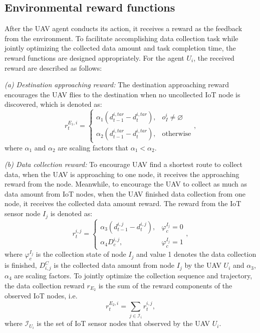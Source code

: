 \documentclass[conference]{IEEEtran}
\begin{document}
\subsection{Environmental reward functions}
After the UAV agent conducts its action, it receives a reward as the feedback from the environment. 
To facilitate accomplishing data collection task while jointly optimizing the collected data amount and task completion time, the reward functions are designed appropriately. For the agent $U_i$, the received reward are described as follows: 
 
\textit{(a) Destination approaching reward:} The destination approaching reward encourages the UAV flies to the destination when no uncollected IoT node is discovered, which is denoted as: 
\begin{equation}\label{reward_1}
r^{E_1,i}_{t}=
\begin{cases}
            \alpha_{1}\left({d_{t-1}^{i,tar}-d_{t}^{i,tar}}\right), & \mbox{$o^{i}_{I}\neq\varnothing$}\\
            \alpha_{2}\left({d_{t-1}^{i,tar}-d_{t}^{i,tar}}\right), & \mbox{otherwise}
\end{cases},
\end{equation}
where $\alpha_{1}$ and $\alpha_{2}$ are scaling factors that $\alpha_{1} < \alpha_{2}$. 

\textit{(b) Data collection reward:} To encourage UAV find a shortest route to collect data, when the UAV is approaching to one node, it receives the approaching reward from the node. Meanwhile, to encourage the UAV to collect as much as data amount from IoT nodes, when the UAV finished data collection from one node, it receives the collected data amount reward. The reward from the IoT sensor node $I_j$ is denoted as: 
\begin{equation}\label{reward_2_i}
r^{i,j}_{t}=
\begin{cases}
            \alpha_{3}\left({d_{t-1}^{i,j}-d_{t}^{i,j}}\right), & \mbox{$\varphi^{I_j}_c=0$}\\
            \alpha_{4}D_{c}^{i,j}, & \mbox{$\varphi^{I_j}_c=1$}
\end{cases},
\end{equation}
where $\varphi^{I_j}_c$ is the collection state of node $I_j$ and value 1 denotes the data collection is finished, $D^{C}_{i,j}$ is the collected data amount from node $I_j$ by the UAV $U_i$ and $\alpha_{3}$, $\alpha_{4}$ are scaling factors. To jointly optimize the collection sequence and trajectory, the data collection reward $r_{E_2}$ is the sum of the reward components of the observed IoT nodes, i.e.
\begin{equation}\label{reward_2}
r^{E_2,i}_{t}=\sum_{j\in \mathcal{I}_{i}}r^{i,j}_{t},
\end{equation} 
where $\mathcal{I}_{U_{i}}$ is the set of IoT sensor nodes that observed by the UAV $U_i$. 
\end{document}
